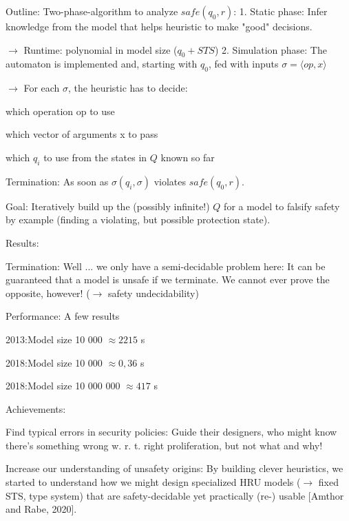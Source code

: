 \documentclass[a4paper]{article}
\begin{document}
\begin{multicols}{3}
    Outline: Two-phase-algorithm to analyze $safe(q_0,r)$:
    1. Static phase: Infer knowledge from the model that helps heuristic to make "good" decisions.
    \begin{itemize*}
        \item $\rightarrow$  Runtime: polynomial in model size ($q_0 + STS$)
        2. Simulation phase: The automaton is implemented and, starting with $q_0$, fed with inputs $\sigma=⟨op,x⟩$
        \begin{itemize*}
            \item $\rightarrow$  For each $\sigma$, the heuristic has to decide:
            \begin{itemize*}
                \item which operation op to use
                \item which vector of arguments x to pass
                \item which $q_i$ to use from the states in $Q$ known so far
            \end{itemize*}
            \item Termination: As soon as $\sigma(q_i,\sigma)$ violates $safe(q_0,r)$.
        \end{itemize*}
    \end{itemize*}

    Goal: Iteratively build up the (possibly infinite!) $Q$ for a model to falsify safety by example (finding a violating, but possible protection state).

    Results:
    \begin{itemize*}
        \item Termination: Well ... we only have a semi-decidable problem here: It can be guaranteed that a model is unsafe if we terminate. We cannot ever prove the opposite, however! ($\rightarrow$ safety undecidability)
        \item Performance: A few results
        \begin{itemize*}
            \item 2013:Model size 10 000 $\approx 2215$ s
            \item 2018:Model size 10 000 $\approx 0,36$ s
            \item 2018:Model size 10 000 000 $\approx 417$ s
        \end{itemize*}
    \end{itemize*}

    Achievements:
    \begin{itemize*}
        \item Find typical errors in security policies: Guide their designers, who might know there’s something wrong w. r. t. right proliferation, but not what and why!
        \item Increase our understanding of unsafety origins: By building clever heuristics, we started to understand how we might design specialized HRU models ($\rightarrow$ fixed STS, type system) that are safety-decidable yet practically (re-) usable [Amthor and Rabe, 2020].
    \end{itemize*}


\end{multicols}
\end{document}
